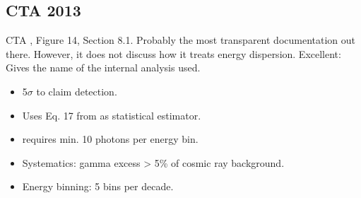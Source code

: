 \documentclass{article}%
\begin{document}
        \subsection{CTA 2013}
            CTA \citep{bernlohr2013monte}, Figure 14, Section 8.1. Probably the most transparent documentation out there.
            However, it does not discuss how it treats energy dispersion.
            Excellent: Gives the name of the internal analysis used.
            \begin{itemize}
                \item 5$\sigma$ to claim detection.
                \item Uses Eq. 17 from \citep{li1983analysis} as statistical estimator.
                \item requires min. 10 photons per energy bin.
                \item Systematics: gamma excess > 5\% of cosmic ray background.
                \item Energy binning: 5 bins per decade.
            \end{itemize}
\end{document}
